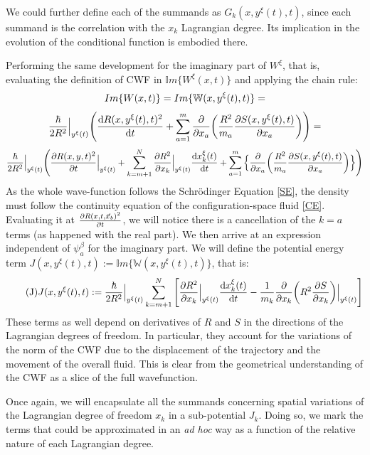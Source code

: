 \documentclass[11pt, a4paper]{article} %
\newcommand{\W}{\mathbb{W}}
\begin{document}
We could further define each of the summands as $G_k(x,y^\xi(t),t)$, since each summand is the correlation with the $x_k$ Lagrangian degree. Its implication in the evolution of the conditional function is embodied there.

Performing the same development for the imaginary part of $W^\xi$, that is, evaluating the definition of CWF in $\mathbb{I}m\{W^\xi(x,t)\}$ and applying the chain rule:
$$
Im\{W(x,t)\}=Im\{\W(x, y^\xi(t),t)\}=\vspace{-0.1cm}
$$
$$
\frac{\hbar}{2R^2}\Big\rvert_{y^\xi(t)} \qty( \dv{R(x, y^\xi(t),t)^2}{t} + \sum_{a=1}^m\pdv{}{x_a} \qty(\frac{R^2}{m_a} \pdv{S(x, y^\xi(t),t)}{x_a} ))=\vspace{-0.1cm}
$$
$$
\frac{\hbar}{2R^2}\Big\rvert_{y^\xi(t)} \qty( \pdv{R(x,y,t)^2}{t}\Big\rvert_{y^\xi(t)} + \sum_{k=m+1}^N \pdv{R^2}{x_k}\Big\rvert_{y^\xi(t)} \dv{x_k^\xi(t)}{t} + \sum_{a=1}^m\Big\{\pdv{}{x_a} \qty(\frac{R^2}{m_a} \pdv{S(x, y^\xi(t),t)}{x_a} ) \Big\})
$$
As the whole wave-function follows the Schrödinger Equation \eqref{SE}, the density must follow the continuity equation of the configuration-space fluid \eqref{CE}. Evaluating it at $\pdv{R(x,t, \vec{x}_b)^2}{t}$, we will notice there is a cancellation of the $k=a$ terms (as happened with the real part). We then arrive at an expression independent of $\psi_a^\beta$ for the imaginary part. We will define the potential energy term $J(x, y^\xi(t),t):=\mathbb{I}m\{\W(x, y^\xi(t),t)\}$, that is:
\begin{equation}\label{J}\tag{J}
J(x, y^\xi(t),t):= \frac{\hbar}{2R^2}\Big\rvert_{y^\xi(t)} \sum_{k=m+1}^N \qty[ \pdv{R^2}{x_k}\Big\rvert_{y^\xi(t)} \dv{x_k^\xi(t)}{t} - \frac{1}{m_k} \pdv{}{x_k} \qty(R^2 \pdv{S}{x_k} )\Big\rvert_{y^\xi(t)} ]
\end{equation}
These terms as well depend on derivatives of $R$ and $S$ in the directions of the Lagrangian degrees of freedom. In particular, they account for the variations of the norm of the CWF due to the displacement of the trajectory and the movement of the overall fluid. This is clear from the geometrical understanding of the CWF as a slice of the full wavefunction. 

Once again, we will encapsulate all the summands concerning spatial variations of the Lagrangian degree of freedom $x_k$ in a sub-potential $J_k$. Doing so, we mark the terms that could be approximated in an {\em ad hoc} way as a function of the relative nature of each Lagrangian degree.
\end{document}
